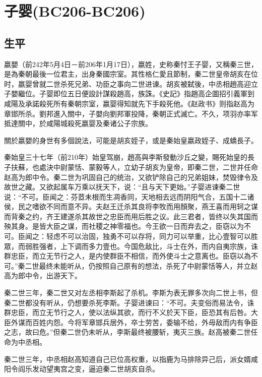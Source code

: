 
\section{子婴\tiny(BC206-BC206)}

\subsection{生平}


嬴嬰（前242年5月4日－前206年1月17日），嬴姓，史称秦忖王子婴，又稱秦三世，是為秦朝最後一位君主，出身秦國宗室。其性格仁愛且節制，秦二世皇帝胡亥在位时，嬴婴曾就二世杀死兄弟、功臣之事向二世进谏。胡亥被弑後，中丞相趙高迎立子嬰繼位。子婴即位五日便設計謀殺趙高，族誅。《史記》指趙高企圖招引義軍到咸陽及承諾殺死所有秦朝宗室，嬴婴得知就先下手殺死他。《赵政书》则指赵高为章邯所杀。劉邦進入關中，子嬰向劉邦軍投降，秦朝正式滅亡。不久，项羽亦率军抵達關中，於咸陽城殺死嬴婴及秦诸公子宗族。

關於嬴嬰的身世有多個說法，可能是胡亥姪子，或是秦始皇嬴政姪子、成蟜長子。

秦始皇三十七年（前210年）始皇驾崩，趙高與李斯發動沙丘之變，賜死始皇的長子扶蘇，也處決中尉蒙恬、蒙毅等人，立幼子胡亥为皇帝，即秦二世，二世并任命赵高为郎中令。秦二世为巩固自己的统治，又欲铲除自己的兄弟姐妹，焚毁律令及故世之藏。又欲起属车万乘以抚天下，说：“且与天下更始。”子婴进谏秦二世说：“不可。臣闻之：芬茝未根而生凋香同，天地相去远而阴阳气合，五国十二诸侯，民之嗜欲不同而意不异。夫赵王迁杀其良将李牧而用顏聚，燕王喜而用轲之谋而背秦之约，齐王建遂杀其故世之忠臣而用后胜之议。此三君者，皆终以失其国而殃其身。是皆大臣之谋，而社稷之神零福也。今王欲一日而弃去之，臣窃以为不可。臣闻之：轻虑不可以治固，独勇不可以存将，同力可以举重，比心壹智可以胜眾，而弱胜强者，上下调而多力壹也。今国危敌比，斗士在外，而内自夷宗族，诛群忠臣，而立无节行之人，是内使群臣不相信，而外使斗士之意离也。臣窃以為不可。”秦二世最终未能听从，仍按照自己原有的想法，杀死了中尉蒙恬等人，并立赵高为郎中令，出游天下。

秦二世三年，秦二世又对左丞相李斯起了杀机。李斯为表无罪多次向二世上书，但秦二世都没有听从，仍想要杀死李斯。子婴进谏曰：“不可。夫变俗而易法令，诛群忠臣，而立无节行之人，使以法纵其欲，而行不义於天下臣，臣恐其有后咎。大臣外谋而百姓内怨。今将军章邯兵居外，卒士劳苦，委输不给，外毋敌而内有争臣之志，故曰危。”但秦二世仍未听从，李斯最终被腰斩，夷灭三族。赵高被秦二世任命为中丞相。

秦二世三年，中丞相赵高知道自己已位高权重，以指鹿为马排除异己后，派女婿咸阳令阎乐发动望夷宫之变，逼迫秦二世胡亥自杀。

